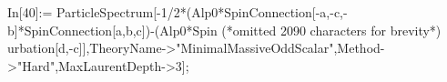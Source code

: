 In[40]:= ParticleSpectrum[-1/2*(Alp0*SpinConnection[-a,-c,-b]*SpinConnection[a,b,c])-(Alp0*Spin (*omitted 2090 characters for brevity*) urbation[d,-c]],TheoryName->"MinimalMassiveOddScalar",Method->"Hard",MaxLaurentDepth->3];